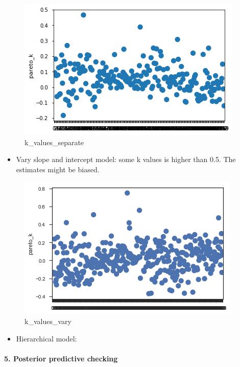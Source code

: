 \documentclass[11pt]{article}
\makeatletter
\def\maxwidth{\ifdim\Gin@nat@width>\linewidth\linewidth
    \else\Gin@nat@width\fi}
\let\Oldincludegraphics\includegraphics
\renewcommand{\includegraphics}[1]{\Oldincludegraphics[width=.8\maxwidth]{#1}}
\providecommand{\tightlist}{%
      \setlength{\itemsep}{0pt}\setlength{\parskip}{0pt}}
\makeatother
\begin{document}
\begin{figure}
\centering
\includegraphics{./Fig/nyc/k_separate.png}
\caption{k\_values\_separate}
\end{figure}

\begin{itemize}
\tightlist
\item
  Vary slope and intercept model: some k values is higher than 0.5. The
  estimates might be biased.
\end{itemize}

\begin{figure}
\centering
\includegraphics{./Fig/nyc/k_varymodel.png}
\caption{k\_values\_vary}
\end{figure}

\begin{itemize}
\tightlist
\item
  Hierarchical model:
\end{itemize}

\paragraph{5. Posterior predictive
checking}\label{posterior-predictive-checking}
\end{document}

